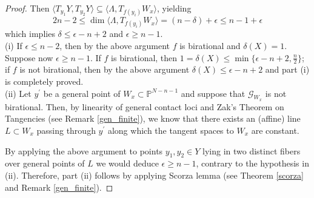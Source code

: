 \documentclass[11pt]{amsart}
\def\P{{\mathbb P}}
\theoremstyle{theorem} %
\theoremstyle{definition}
\numberwithin{equation}{section}
\begin{document}
\begin{proof}
Then $\langle T_{y_1}Y,T_{y_2}Y\rangle\subseteq \langle \Lambda, T_{f(y_i)}W_x \rangle$, yielding
\begin{displaymath}
2n-2\le\dim\langle \Lambda,T_{f(y_i)}W_x\rangle = (n-\delta)+\epsilon \le n-1+\epsilon
\end{displaymath}
which implies $\delta\le\epsilon-n+2$ and $\epsilon \ge n-1$.\\

(i) If $\epsilon\le n-2$, then by the above argument $f$ is birational and $\delta(X)=1$. Suppose now $\epsilon\ge n-1$. If $f$ is birational, then $1=\delta(X)\le\min\{\epsilon-n+2,\frac{n}{2}\}$; if $f$ is not birational, then by the above argument $\delta(X)\le\epsilon-n+2$ and part (i) is completely proved.\\

(ii) Let $y^\prime$ be a general point of $W_x\subset\P^{N-n-1}$ and suppose that $\mathcal G_{W_x}$ is not birational. Then, by linearity of general contact loci and Zak's Theorem on Tangencies (see Remark \ref{gen_finite}), we know that there exists an (affine) line $L\subset W_x$ passing through $y^\prime$ along which the tangent spaces to $W_x$  are constant.

By applying the above argument to points $y_1, y_2\in Y$ lying in two distinct fibers over general points of $L$ we would deduce $\epsilon\ge n-1$, contrary to the hypothesis in (ii). Therefore, part (ii) follows by applying Scorza lemma (see Theorem \ref{scorza} and Remark \ref{gen_finite}). 

\end{proof}
\end{document}
